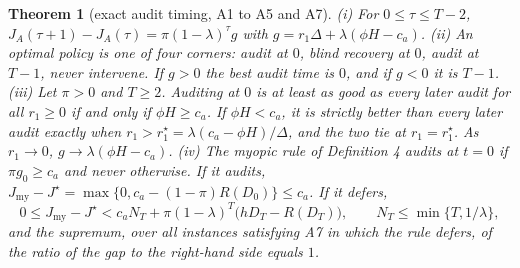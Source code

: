 \documentclass[11pt]{article}
\newtheorem{theorem}{Theorem}
\theoremstyle{definition}
\begin{document}
\begin{theorem}[exact audit timing, A1 to A5 and A7]\label{thm:timing}
(i) For $0\le\tau\le T-2$, $J_A(\tau+1)-J_A(\tau)=\pi(1-\lambda)^\tau g$ with $g=r_1\Delta+\lambda(\phi H-c_a)$.
(ii) An optimal policy is one of four corners: audit at $0$, blind recovery at $0$, audit at $T-1$, never
intervene. If $g>0$ the best audit time is $0$, and if $g<0$ it is $T-1$.
(iii) Let $\pi>0$ and $T\ge2$. Auditing at $0$ is at least as good as every later audit for all
$r_1\ge0$ if and only if $\phi H\ge c_a$. If $\phi H<c_a$, it is strictly better than every later audit exactly when
$r_1>r_1^\star=\lambda(c_a-\phi H)/\Delta$, and the two tie at $r_1=r_1^\star$. As $r_1\to0$,
$g\to\lambda(\phi H-c_a)$.
(iv) The myopic rule of Definition 4 audits at $t=0$ if $\pi g_0\ge c_a$ and never otherwise. If it audits,
$J_{\mathrm{my}}-J^\star=\max\{0,c_a-(1-\pi)R(D_0)\}\le c_a$. If it defers,
\[0\le J_{\mathrm{my}}-J^\star<c_aN_T+\pi(1-\lambda)^T\big(hD_T-R(D_T)\big),\qquad N_T\le\min\{T,1/\lambda\},\]
and the supremum, over all instances satisfying A7 in which the rule defers, of the ratio of the gap to the
right-hand side equals $1$.
\end{theorem}
\end{document}
